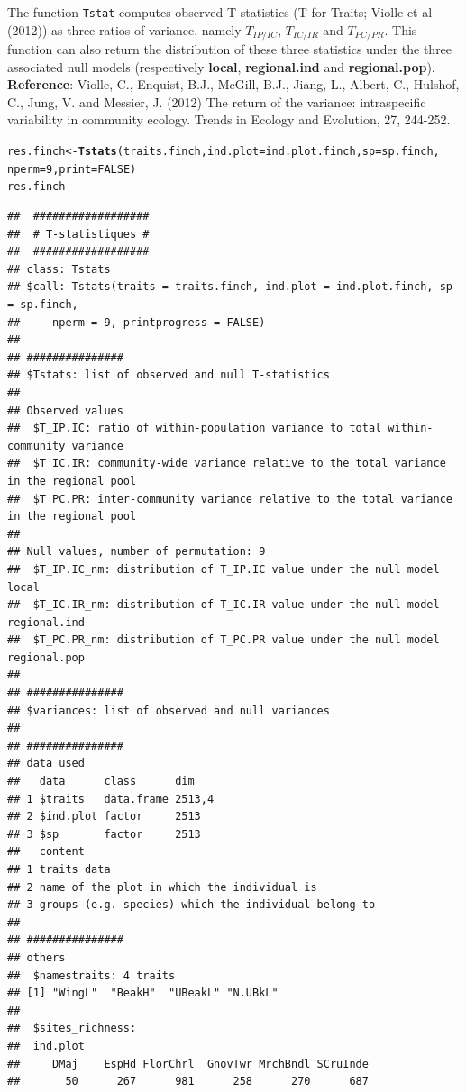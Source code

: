 \documentclass[12pt]{article}\usepackage[]{graphicx}\usepackage[]{color}
\makeatletter
\newcommand{\hlnum}[1]{\textcolor[rgb]{0.686,0.059,0.569}{#1}}%
\newcommand{\hlstd}[1]{\textcolor[rgb]{0.345,0.345,0.345}{#1}}%
\newcommand{\hlkwb}[1]{\textcolor[rgb]{0.69,0.353,0.396}{#1}}%
\newcommand{\hlkwc}[1]{\textcolor[rgb]{0.333,0.667,0.333}{#1}}%
\newcommand{\hlkwd}[1]{\textcolor[rgb]{0.737,0.353,0.396}{\textbf{#1}}}%
\newenvironment{kframe}{%
 \def\at@end@of@kframe{}%
 \ifinner\ifhmode%
  \def\at@end@of@kframe{\end{minipage}}%
  \begin{minipage}{\columnwidth}%
 \fi\fi%
 \def\FrameCommand##1{\hskip\@totalleftmargin \hskip-\fboxsep
 \colorbox{shadecolor}{##1}\hskip-\fboxsep
     \hskip-\linewidth \hskip-\@totalleftmargin \hskip\columnwidth}%
 \MakeFramed {\advance\hsize-\width
   \@totalleftmargin\z@ \linewidth\hsize
   \@setminipage}}%
 {\par\unskip\endMakeFramed%
 \at@end@of@kframe}
\newenvironment{knitrout}{}{} %
\makeatother
\begin{document}
The function \texttt{Tstat} computes observed T-statistics (T for Traits; Violle et al (2012)) as three ratios of variance, namely $T_{IP/IC}$, $T_{IC/IR}$ and $T_{PC/PR}$. This function can also return the distribution of these three statistics under the three associated null models (respectively \textbf{local}, \textbf{regional.ind} and \textbf{regional.pop}).
\\

\textbf{Reference}: Violle, C., Enquist, B.J., McGill, B.J., Jiang, L., Albert, C., Hulshof, C., Jung, V. and Messier, J. (2012) The return of the variance: intraspecific variability in community ecology. Trends in Ecology and Evolution, 27, 244-252.

\begin{knitrout}
\color{fgcolor}\begin{kframe}
\begin{alltt}
\hlstd{res.finch}\hlkwb{<-}\hlkwd{Tstats}\hlstd{(traits.finch,} \hlkwc{ind.plot} \hlstd{= ind.plot.finch,} \hlkwc{sp} \hlstd{= sp.finch,}
         \hlkwc{nperm} \hlstd{=} \hlnum{9}\hlstd{,} \hlkwc{print} \hlstd{=} \hlnum{FALSE}\hlstd{)}
\hlstd{res.finch}
\end{alltt}
\begin{verbatim}
## 	##################
## 	# T-statistiques #
## 	##################
## class: Tstats
## $call: Tstats(traits = traits.finch, ind.plot = ind.plot.finch, sp = sp.finch, 
##     nperm = 9, printprogress = FALSE)
## 
## ###############
## $Tstats: list of observed and null T-statistics
## 
## Observed values
## 	$T_IP.IC: ratio of within-population variance to total within-community variance
## 	$T_IC.IR: community-wide variance relative to the total variance in the regional pool
## 	$T_PC.PR: inter-community variance relative to the total variance in the regional pool
## 
## Null values, number of permutation: 9
## 	$T_IP.IC_nm: distribution of T_IP.IC value under the null model local
## 	$T_IC.IR_nm: distribution of T_IC.IR value under the null model regional.ind 
## 	$T_PC.PR_nm: distribution of T_PC.PR value under the null model regional.pop
## 
## ###############
## $variances: list of observed and null variances
## 
## ###############
## data used
##   data      class      dim   
## 1 $traits   data.frame 2513,4
## 2 $ind.plot factor     2513  
## 3 $sp       factor     2513  
##   content                                             
## 1 traits data                                         
## 2 name of the plot in which the individual is         
## 3 groups (e.g. species) which the individual belong to
## 
## ###############
## others
## 	$namestraits: 4 traits
## [1] "WingL"  "BeakH"  "UBeakL" "N.UBkL"
## 
## 	$sites_richness:
## 	ind.plot
##     DMaj    EspHd FlorChrl  GnovTwr MrchBndl SCruInde 
##       50      267      981      258      270      687
\end{verbatim}
\end{kframe}
\end{knitrout}
\end{document}
